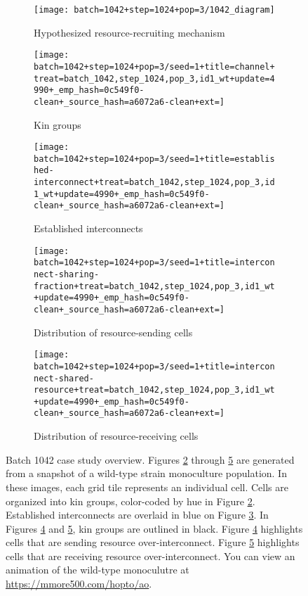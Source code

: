 \begin{figure}[!htbp]
\begin{center}
\begin{subfigure}[b]{\linewidth}
  \texttt{[image: batch=1042+step=1024+pop=3/1042\_diagram]}
  \caption{Hypothesized resource-recruiting mechanism}
  \label{fig:mechanism1}
\end{subfigure}
\begin{subfigure}[b]{0.45\linewidth}
  \texttt{[image: batch=1042+step=1024+pop=3/seed=1+title=channel+treat=batch\_1042,step\_1024,pop\_3,id1\_wt+update=4990+\_emp\_hash=0c549f0-clean+\_source\_hash=a6072a6-clean+ext=]}
  \caption{Kin groups}
  \label{fig:kingroups1}
\end{subfigure}
\begin{subfigure}[b]{0.45\linewidth}
  \texttt{[image: batch=1042+step=1024+pop=3/seed=1+title=established-interconnect+treat=batch\_1042,step\_1024,pop\_3,id1\_wt+update=4990+\_emp\_hash=0c549f0-clean+\_source\_hash=a6072a6-clean+ext=]}
  \caption{Established interconnects}
  \label{fig:establishedinterconnects1}
\end{subfigure}
\begin{subfigure}[b]{0.45\linewidth}
  \texttt{[image: batch=1042+step=1024+pop=3/seed=1+title=interconnect-sharing-fraction+treat=batch\_1042,step\_1024,pop\_3,id1\_wt+update=4990+\_emp\_hash=0c549f0-clean+\_source\_hash=a6072a6-clean+ext=]}
  \caption{Distribution of resource-sending cells}
  \label{fig:resourcesendingdistribution}
\end{subfigure}
\begin{subfigure}[b]{0.45\linewidth}
  \texttt{[image: batch=1042+step=1024+pop=3/seed=1+title=interconnect-shared-resource+treat=batch\_1042,step\_1024,pop\_3,id1\_wt+update=4990+\_emp\_hash=0c549f0-clean+\_source\_hash=a6072a6-clean+ext=]}
  \caption{Distribution of resource-receiving cells}
  \label{fig:resourcereceivingdistribution}
\end{subfigure}
\caption{
Batch 1042 case study overview.
Figures \ref{fig:kingroups1} through \ref{fig:resourcereceivingdistribution} are generated from a snapshot of a wild-type strain monoculture population.
In these images, each grid tile represents an individual cell.
Cells are organized into kin groups, color-coded by hue in Figure \ref{fig:kingroups1}.
Established interconnects are overlaid in blue on Figure \ref{fig:establishedinterconnects1}.
In Figures \ref{fig:resourcesendingdistribution} and \ref{fig:resourcereceivingdistribution}, kin groups are outlined in black.
Figure \ref{fig:resourcesendingdistribution} highlights cells that are sending resource over-interconnect.
Figure \ref{fig:resourcereceivingdistribution} highlights cells that are receiving resource over-interconnect.
You can view an animation of the wild-type monoculutre at \url{https://mmore500.com/hopto/ao}.
}
\label{fig:case_study_1042}
\end{center}
\end{figure}
